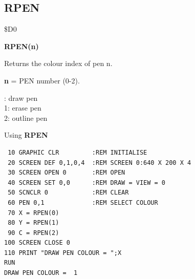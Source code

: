 \subsection{RPEN}
\begin{description}[leftmargin=2cm,style=nextline]
\item [Token:] \$D0
\item [Format:] {\bf RPEN(n)}
\item [Usage:]  Returns the colour index of pen n.

                {\bf n} = PEN number (0-2).

{: draw pen \\
                1: erase pen \\
                2: outline pen
}

\item [Example:] Using {\bf RPEN}

\begin{tcolorbox}[colback=black,coltext=white]
\verbatimfont{\codefont}
\begin{verbatim}
 10 GRAPHIC CLR         :REM INITIALISE
 20 SCREEN DEF 0,1,0,4  :REM SCREEN 0:640 X 200 X 4
 30 SCREEN OPEN 0       :REM OPEN
 40 SCREEN SET 0,0      :REM DRAW = VIEW = 0
 50 SCNCLR 0            :REM CLEAR
 60 PEN 0,1             :REM SELECT COLOUR
 70 X = RPEN(0)
 80 Y = RPEN(1)
 90 C = RPEN(2)
100 SCREEN CLOSE 0
110 PRINT "DRAW PEN COLOUR = ";X
RUN
DRAW PEN COLOUR =  1
\end{verbatim}
\end{tcolorbox}
\end{description}


\newpage
